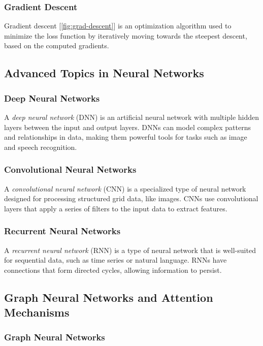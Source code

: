 \subsubsection{Gradient Descent}
Gradient descent [\autoref{fig:grad-descent}] is an optimization algorithm used to minimize the loss function by iteratively moving towards the steepest descent, based on the computed gradients.


\subsection{Advanced Topics in Neural Networks}

\subsubsection{Deep Neural Networks}
A \emph{deep neural network} (DNN) is an artificial neural network with multiple hidden layers between the input and output layers. DNNs can model complex patterns and relationships in data, making them powerful tools for tasks such as image and speech recognition.


\subsubsection{Convolutional Neural Networks}
A \emph{convolutional neural network} (CNN) is a specialized type of neural network designed for processing structured grid data, like images. CNNs use convolutional layers that apply a series of filters to the input data to extract features.


\subsubsection{Recurrent Neural Networks}
A \emph{recurrent neural network} (RNN) is a type of neural network that is well-suited for sequential data, such as time series or natural language. RNNs have connections that form directed cycles, allowing information to persist.


\subsection{Graph Neural Networks and Attention Mechanisms}

\subsubsection{Graph Neural Networks}

